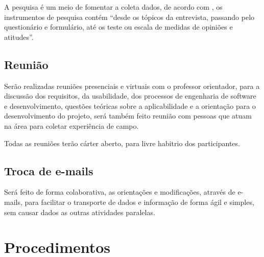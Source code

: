
\par A pesquisa é um meio de fomentar a coleta dados, de acordo com
, os instrumentos de pesquisa contém “desde os
tópicos da entrevista, passando pelo questionário e formulário, 
até os teste ou escala de medidas de opiniões e atitudes”.

\subsection{Reunião}

\par Serão realizadas reuniões presenciais e virtuais com o professor
orientador, para a discussão dos requisitos, da usabilidade, 
dos processos de engenharia de software e desenvolvimento, questões 
teóricas sobre a aplicabilidade e a orientação para o desenvolvimento do
projeto, será também feito reunião com pessoas que atuam na área para coletar
experiência de campo.

\par Todas as reuniões terão cárter aberto, para livre habitrio dos
participantes.

\subsection{Troca de e-mails}

\par Será feito de forma colaborativa, as orientações e modificações, através de
e-mails, para facilitar o transporte de dados e informação de forma ágil e
simples, sem causar dados as outras atividades paralelas.


\section{Procedimentos}




